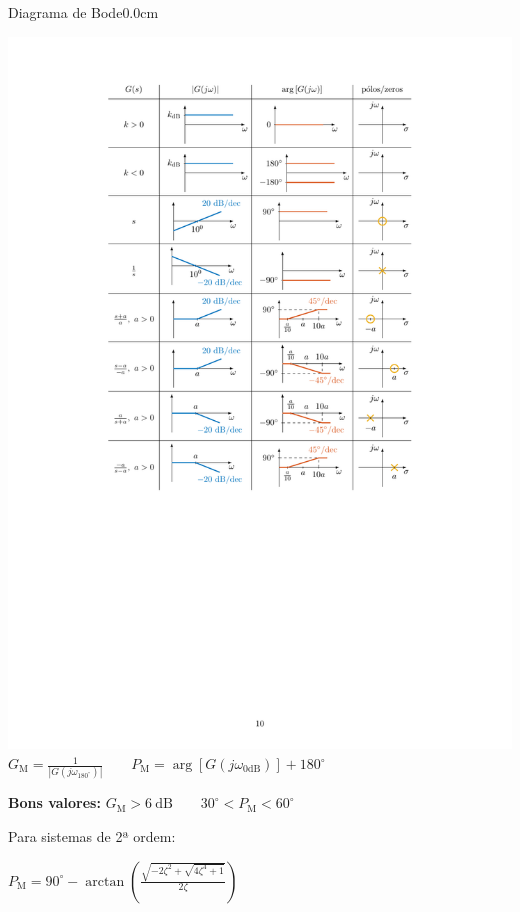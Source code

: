 \documentclass[portuguese,10pt,3col]{cheatsheet}
\begin{document}
\begin{multicols}{3}
\begin{cheatsheetbox}{Diagrama de Bode}{0.0cm}
    \begin{center}
        \includegraphics[scale = 0.66, trim = 4.2cm 10.9cm 4.2cm 2cm, clip]{figs/fig11.pdf} \\
    
        $G_\text{M} = \frac{1}{|G(j\omega_{180^\circ})|} \qquad P_\text{M} = \arg\left[G(j\omega_{0 \text{dB}})\right] + 180^\circ$
    \end{center}
    
    \textbf{Bons valores:} $G_\text{M} > 6 \ \text{dB} \qquad 30^\circ < P_\text{M} < 60^\circ$
    
    Para sistemas de 2ª ordem: 
    
    $P_\text{M} = 90^\circ - \arctan\left(\frac{\sqrt{-2\zeta^2 + \sqrt{4\zeta^4 + 1}}}{2 \zeta}\right)$
\end{cheatsheetbox}


\end{multicols}
\end{document}
